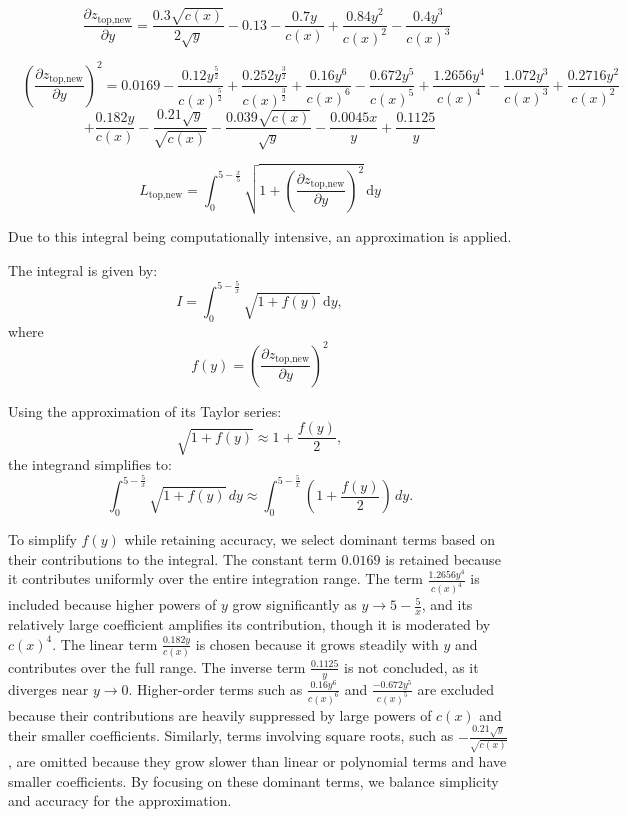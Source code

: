 \documentclass[12pt]{article}
\begin{document}
\[\quad \frac{\partial z_{\text{top,new}}}{\partial y} = \frac{0.3\sqrt{c(x)}}{2\sqrt{y}} - 0.13 - \frac{0.7y}{c(x)} + \frac{0.84y^2}{c(x)^2} - \frac{0.4y^3}{c(x)^3} \]


\[\quad \left(\frac{\partial z_{\text{top,new}}}{\partial y}\right)^2 = 0.0169 - \frac{0.12y^{\frac{5}{2}}}{c(x)^{\frac{5}{2}}} + \frac{0.252y^{\frac{3}{2}}}{c(x)^{\frac{3}{2}}} + \frac{0.16y^6}{c(x)^6} - \frac{0.672y^5}{c(x)^5} + \frac{1.2656y^4}{c(x)^4} - \frac{1.072y^3}{c(x)^3} + \frac{0.2716y^2}{c(x)^2}\]
\[+ \frac{0.182y}{c(x)} - \frac{0.21\sqrt{y}}{\sqrt{c(x)}} - \frac{0.039\sqrt{c(x)}}{\sqrt{y}} - \frac{0.0045x}{y} + \frac{0.1125}{y} \]

\[ L_{\text{top,new}} = \int_0^{5 - \frac{x}{5}} \sqrt{1 + \left( \frac{\partial z_{\text{top,new}}}{\partial y}\right)^2} \, \mathrm{d}y\]


Due to this integral being computationally intensive, an approximation is applied.

The integral is given by:
\[
I = \int_0^{5 - \frac{5}{x}} \sqrt{1 + f(y)} \, \mathrm{d}y,
\]
where
\[
f(y) = \left(\frac{\partial z_{\text{top,new}}}{\partial y}\right)^2
\]

Using the approximation of its Taylor series:
\[
\sqrt{1 + f(y)} \approx 1 + \frac{f(y)}{2},
\]
the integrand simplifies to:
\[
\int_0^{5 - \frac{5}{x}} \sqrt{1 + f(y)} \, dy \approx \int_0^{5 - \frac{5}{x}} \left(1 + \frac{f(y)}{2}\right) \, dy.
\]



To simplify \(f(y)\) while retaining accuracy, we select dominant terms based on their contributions to the integral. The constant term \(0.0169\) is retained because it contributes uniformly over the entire integration range. The term \(\frac{1.2656 y^4}{c(x)^4}\) is included because higher powers of \(y\) grow significantly as \(y \to 5 - \frac{5}{x}\), and its relatively large coefficient amplifies its contribution, though it is moderated by \(c(x)^4\). The linear term \(\frac{0.182 y}{c(x)}\) is chosen because it grows steadily with \(y\) and contributes over the full range. The inverse term \(\frac{0.1125}{y}\) is not concluded, as it diverges near \(y \to 0\). Higher-order terms such as \(\frac{0.16 y^6}{c(x)^6}\) and \(\frac{-0.672 y^5}{c(x)^5}\) are excluded because their contributions are heavily suppressed by large powers of \(c(x)\) and their smaller coefficients. Similarly, terms involving square roots, such as \(-\frac{0.21 \sqrt{y}}{\sqrt{c(x)}}\), are omitted because they grow slower than linear or polynomial terms and have smaller coefficients. By focusing on these dominant terms, we balance simplicity and accuracy for the approximation.
\end{document}
